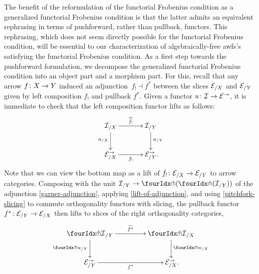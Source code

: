 \documentclass[reqno,10pt,a4paper,oneside,draft]{amsart}
\begin{document}
{{The benefit of the reformulation of the functorial Frobenius condition as a generalized functorial Frobenius condition is that the latter admits an equivalent rephrasing in terms of pushforward, rather than pullback, functors.
This rephrasing, which does not seem directly possible for the functorial Frobenius condition, will be essential to our characterization of algebraically-free awfs's satisfying the functorial Frobenius condition.
As a first step towards the pushforward formulation, we decompose the generalized functorial Frobenius condition into an object part and a morphism part.
For this, recall that any arrow $f \co X \to Y$ induced an adjunction~$f_{!} \dashv f^*$ between the slices $\cal{E}_{/X}$ and $\cal{E}_{/Y}$ given by left composition $f_{!}$ and pullback $f^*$.
Given a functor $u \co \cal{I} \to \catE^\to$, it is immediate to check that the left composition functor lifts as follows:
\[
\xymatrix@C+1em{
  \cal{I}_{/X}
  \ar[r]^-{\widetilde{f_!}}
  \ar[d]_{u_{/X}}
&
  \cal{I}_{/Y}
  \ar[d]^{u_{/Y}}
\\
  \calE_{/X}^\to
  \ar[r]_-{f_!}
&
  \calE_{/Y}^\to
\rlap{.}}
\]
Note that we can view the bottom map as a lift of $f_! \co \cal{E}_{/X} \to \cal{E}_{/Y}$ to arrow categories.
Composing with the unit $\cal{I}_{/Y} \to \liftl{(\liftr{(\cal{I}_{/Y})})}$ of the adjunction \eqref{garner-adjunction}, applying \cref{lift-of-adjunction}, and using \cref{pitchfork-slicing} to commute orthogonality functors with slicing, the pullback functor $f^* \co \catE_{/Y} \to \catE_{/X}$ then lifts to slices of the right orthogonality categories,
\[
\xymatrix@C=1.5cm{
  \liftr{\cal{I}}_{/Y}
  \ar[d]_{{\liftr{u}}_{/Y}}
  \ar[r]^{\widetilde{f^*}}
&
  \liftr{\cal{I}}_{/X}
  \ar[d]^{{\liftr{u}}_{/X}}
\\
  {\catE}_{/Y}^\to
  \ar[r]_{f^*}
&
  \catE_{/X}^\to
\rlap{.}}
\]

}}
\end{document}
